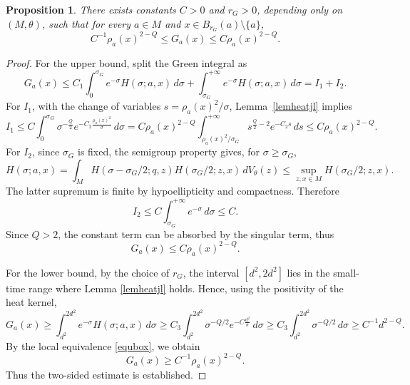 \documentclass[11pt]{article}
\numberwithin{equation}{section}
\newtheorem{proposition}{Proposition}[section]
\numberwithin{equation}{section}
\begin{document}
	\begin{proposition}\label{propgreenestimate}
		There exists  constants \(C>0\) and \(r_G>0\), depending only on \((M, \theta)\), such that for every \(a \in M\) and \(x \in B_{r_G}(a)\setminus\{a\}\),
		\[
		C^{-1} \rho_a(x)^{2-Q} \le G_a(x) \le C \rho_a(x)^{2-Q}.
		\]
	\end{proposition}
	\begin{proof}
		For the upper bound, split the Green integral as
		\[
		G_a(x) \le C_1\int_0^{\sigma_G} e^{-\sigma} H(\sigma; a, x) \,d\sigma + \int_{\sigma_G}^{+\infty} e^{-\sigma} H(\sigma; a, x) \,d\sigma = I_1 + I_2.
		\]
		For \(I_1\), with the change of variables \(s = \rho_a(x)^2/\sigma\), Lemma~\ref{lemheatjl} implies
		\[
		I_1 \le  C\int_0^{\sigma_G} \sigma^{-\frac{Q}{2}} e^{-C_2 \frac{\rho_a(x)^2}{\sigma}}\,d\sigma = C \rho_a(x)^{2-Q} \int_{\rho_a(x)^2/\sigma_G}^{+\infty} s^{\frac{Q}{2}-2} e^{-C_2 s} \,ds \le C \rho_a(x)^{2-Q}.
		\]
		For \(I_2\), since \(\sigma_G\) is fixed, the semigroup property gives, for \(\sigma \ge \sigma_G\),
		\[
		H(\sigma; a, x) = \int_M H(\sigma - \sigma_G/2; q, z) H(\sigma_G/2; z, x) \,d V_\theta(z) \le \sup_{z, x \in M} H(\sigma_G/2; z, x).
		\]
		The latter supremum is finite by hypoellipticity and compactness. Therefore
		\[
		I_2 \le C \int_{\sigma_G}^{+\infty} e^{-\sigma} \,d\sigma \le C.
		\]
		Since \(Q>2\), the constant term can be absorbed by the singular term, thus
		\[
		G_a(x) \le C \rho_a(x)^{2-Q}.
		\]
		
		For the lower bound, by the choice of \(r_G\), the interval \([d^2,2d^2]\) lies in the small-time range where Lemma \ref{lemheatjl} holds.  Hence, using the positivity of the heat kernel,
		\[
		G_a(x) \ge \int_{d^2}^{2d^2} e^{-\sigma} H(\sigma; a, x) \,d\sigma \ge C_3 \int_{d^2}^{2d^2} \sigma^{-Q/2} e^{-C\frac{d^2}{\sigma}} \,d\sigma \ge C_3 \int_{d^2}^{2d^2} \sigma^{-Q/2} \,d\sigma \ge C^{-1} d^{2-Q}.
		\]
		By the local equivalence \eqref{equbox}, we obtain
		\[
		G_a(x) \ge C^{-1} \rho_a(x)^{2-Q}.
		\]
		Thus the two-sided estimate is established.
	\end{proof}
	
\end{document}
